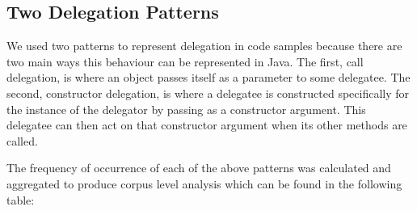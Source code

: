 \subsection{Two Delegation Patterns}
We used two patterns to represent delegation in code samples because there are two main ways this behaviour can be represented in Java. The first, call delegation, is where an object passes itself as a parameter to some delegatee. The second, constructor delegation, is where a delegatee is constructed specifically for the instance of the delegator by passing  as a constructor argument. This delegatee can then act on that constructor argument when its other methods are called.
\newline

The frequency of occurrence of each of the above patterns was calculated and aggregated to produce corpus level analysis which can be found in the following table:

